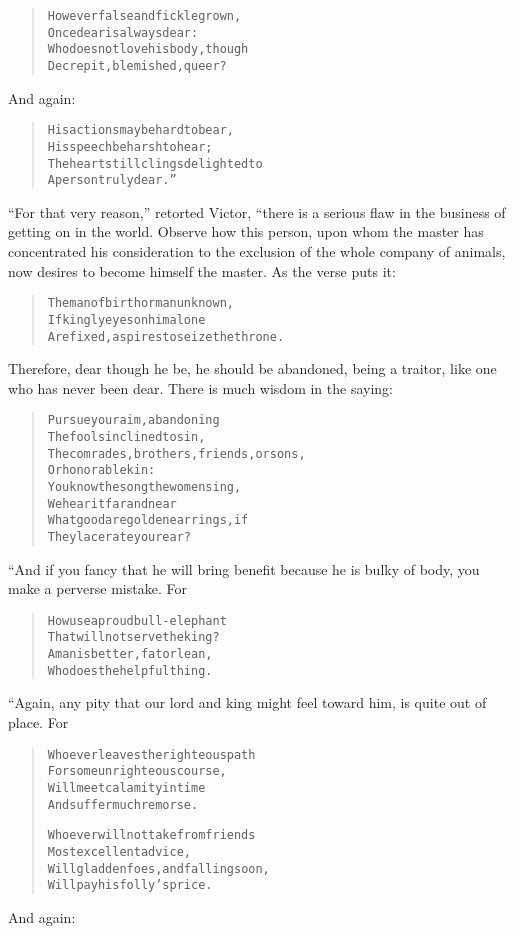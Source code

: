 \documentclass[article, twoside, 14pt]{memoir}
\renewenvironment{verbatim}{%
\begin{quote}%
\vskip -10pt%
\begin{alltt}\normalfont\large}{\end{alltt}%
\end{quote}%
\vskip -10pt
} %
\begin{document}
\begin{verbatim}
However false and fickle grown,
    Once dear is always dear:
Who does not love his body, though
    Decrepit, blemished, queer?
\end{verbatim}
And again:

\begin{verbatim}
His actions may be hard to bear,
    His speech be harsh to hear;
The heart still clings delighted to
    A person truly dear.”
\end{verbatim}
``For that very reason,'' retorted Victor, “there is a serious flaw
in the business of getting on in the world. Observe how this
person, upon whom the master has concentrated his consideration to
the exclusion of the whole company of animals, now desires to
become himself the master. As the verse puts it:

\begin{verbatim}
The man of birth or man unknown,
If kingly eyes on him alone
Are fixed, aspires to seize the throne.
\end{verbatim}
Therefore, dear though he be, he should be abandoned, being a
traitor, like one who has never been dear. There is much wisdom in
the saying:

\begin{verbatim}
Pursue your aim, abandoning
    The fools inclined to sin,
The comrades, brothers, friends, or sons,
    Or honorable kin:
You know the song the women sing,
    We hear it far and near{\textemdash}
What good are golden earrings, if
    They lacerate your ear?
\end{verbatim}
“And if you fancy that he will bring benefit because he is bulky of
body, you make a perverse mistake. For

\begin{verbatim}
How use a proud bull-elephant
    That will not serve the king?
A man is better, fat or lean,
    Who does the helpful thing.
\end{verbatim}
“Again, any pity that our lord and king might feel toward him, is
quite out of place. For

\begin{verbatim}
Whoever leaves the righteous path
    For some unrighteous course,
Will meet calamity in time
    And suffer much remorse.

Whoever will not take from friends
    Most excellent advice,
Will gladden foes, and falling soon,
    Will pay his folly's price.
\end{verbatim}
And again:
\end{document}

